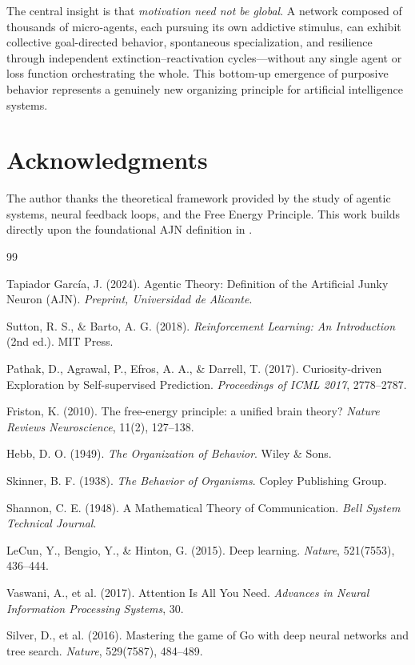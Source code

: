 \documentclass[12pt,a4paper]{article}
\begin{document}
The central insight is that \textit{motivation need not be global}. A network
composed of thousands of micro-agents, each pursuing its own addictive stimulus,
can exhibit collective goal-directed behavior, spontaneous specialization, and
resilience through independent extinction--reactivation cycles---without any
single agent or loss function orchestrating the whole. This bottom-up emergence
of purposive behavior represents a genuinely new organizing principle for
artificial intelligence systems.

\section*{Acknowledgments}

The author thanks the theoretical framework provided by the study of agentic
systems, neural feedback loops, and the Free Energy Principle. This work builds
directly upon the foundational AJN definition in \cite{tapiador2024ajn}.

\begin{thebibliography}{99}

Tapiador García, J. (2024).
Agentic Theory: Definition of the Artificial Junky Neuron (AJN).
\textit{Preprint, Universidad de Alicante}.

Sutton, R. S., \& Barto, A. G. (2018).
\textit{Reinforcement Learning: An Introduction} (2nd ed.).
MIT Press.

Pathak, D., Agrawal, P., Efros, A. A., \& Darrell, T. (2017).
Curiosity-driven Exploration by Self-supervised Prediction.
\textit{Proceedings of ICML 2017}, 2778--2787.

Friston, K. (2010).
The free-energy principle: a unified brain theory?
\textit{Nature Reviews Neuroscience}, 11(2), 127--138.

Hebb, D. O. (1949).
\textit{The Organization of Behavior}.
Wiley \& Sons.

Skinner, B. F. (1938).
\textit{The Behavior of Organisms}.
Copley Publishing Group.

Shannon, C. E. (1948).
A Mathematical Theory of Communication.
\textit{Bell System Technical Journal}.

LeCun, Y., Bengio, Y., \& Hinton, G. (2015).
Deep learning.
\textit{Nature}, 521(7553), 436--444.

Vaswani, A., et al. (2017).
Attention Is All You Need.
\textit{Advances in Neural Information Processing Systems}, 30.

Silver, D., et al. (2016).
Mastering the game of Go with deep neural networks and tree search.
\textit{Nature}, 529(7587), 484--489.

\end{thebibliography}
\end{document}

